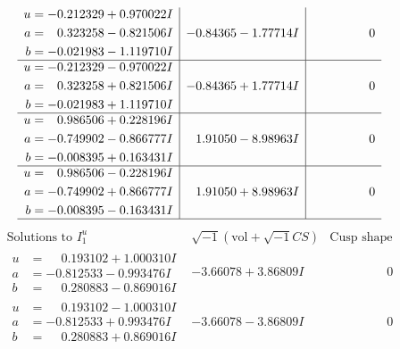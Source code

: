 \documentclass[1p]{elsarticle_modified}
\theoremstyle{definition}
\newcommand{\I}{\sqrt{-1}}
\begin{document}
$$\begin{array}{c|c|c}
\begin{aligned}
u &= -0.212329 + 0.970022 I \\
a &= \phantom{-}0.323258 - 0.821506 I \\
b &= -0.021983 - 1.119710 I\end{aligned}
 & -0.84365 - 1.77714 I & \phantom{-0.000000 } 0 \\ \hline\begin{aligned}
u &= -0.212329 - 0.970022 I \\
a &= \phantom{-}0.323258 + 0.821506 I \\
b &= -0.021983 + 1.119710 I\end{aligned}
 & -0.84365 + 1.77714 I & \phantom{-0.000000 } 0 \\ \hline\begin{aligned}
u &= \phantom{-}0.986506 + 0.228196 I \\
a &= -0.749902 - 0.866777 I \\
b &= -0.008395 + 0.163431 I\end{aligned}
 & \phantom{-}1.91050 - 8.98963 I & \phantom{-0.000000 } 0 \\ \hline\begin{aligned}
u &= \phantom{-}0.986506 - 0.228196 I \\
a &= -0.749902 + 0.866777 I \\
b &= -0.008395 - 0.163431 I\end{aligned}
 & \phantom{-}1.91050 + 8.98963 I & \phantom{-0.000000 } 0\\
 \hline 
 \end{array}$$\newpage$$\begin{array}{c|c|c}  
\text{Solutions to }I^u_{1}& \I (\text{vol} + \sqrt{-1}CS) & \text{Cusp shape}\\
 \hline 
\begin{aligned}
u &= \phantom{-}0.193102 + 1.000310 I \\
a &= -0.812533 - 0.993476 I \\
b &= \phantom{-}0.280883 - 0.869016 I\end{aligned}
 & -3.66078 + 3.86809 I & \phantom{-0.000000 } 0 \\ \hline\begin{aligned}
u &= \phantom{-}0.193102 - 1.000310 I \\
a &= -0.812533 + 0.993476 I \\
b &= \phantom{-}0.280883 + 0.869016 I\end{aligned}
 & -3.66078 - 3.86809 I & \phantom{-0.000000 } 0 \\ \hline\begin{aligned}

\end{aligned}
\end{array}$$
\end{document}
